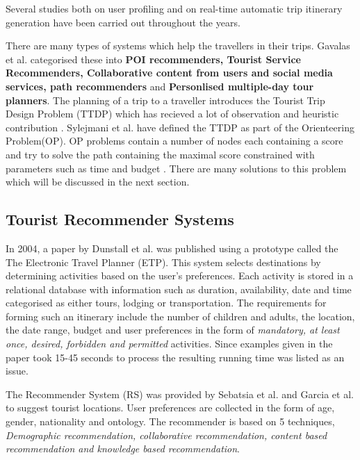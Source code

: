 Several studies both on user profiling and on real-time automatic trip
itinerary generation have been carried out throughout the years. 

There are many types of systems which help the travellers in their
trips. Gavalas et al. \cite{Gavalas2014} categorised these into
\textbf{POI recommenders, Tourist Service Recommenders, Collaborative
content from users and social media services, path recommenders} and
\textbf{Personlised multiple-day tour planners}. The planning of a
trip to a traveller introduces the Tourist Trip Design Problem (TTDP)
which has recieved a lot of observation and heuristic contribution
\cite{Gunawan2016,Delic2018}. Sylejmani et al.\cite{Sylejmani2017}
have defined the TTDP as part of the Orienteering Problem(OP). OP
problems contain a number of nodes each containing a score and try to
solve the path containing the maximal score constrained with
parameters such as time and budget \cite{Gunawan2016}. There are many
solutions to this problem which will be discussed in the next section.

\subsection{Tourist Recommender Systems}

    In 2004, a paper by Dunstall et al. \cite{DUNSTALL2008a} was
    published using a prototype called the The Electronic Travel
    Planner (ETP). This system selects destinations by determining
    activities based on the user’s preferences. Each activity is
    stored in a relational database with information such as duration,
    availability, date and time categorised as either tours, lodging
    or transportation. The requirements for forming such an itinerary
    include the number of children and adults, the location, the date
    range, budget and user preferences in the form of \emph{mandatory,
    at least once, desired, forbidden and permitted} activities. Since
    examples given in the paper took 15-45 seconds to process the
    resulting running time was listed as an issue.

    The Recommender System (RS) was provided by Sebatsia et al.
    \cite{Sebastia2009a} and Garcia et al. \cite{Garcia2011} to
    suggest tourist locations. User preferences are collected in the
    form of age, gender, nationality and ontology. The recommender is
    based on 5 techniques, \emph{Demographic recommendation,
    collaborative recommendation, content based recommendation and
    knowledge based recommendation}. 

